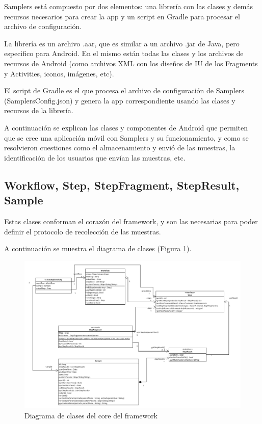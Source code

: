 Samplers está compuesto por dos elementos: una librería con las clases y demás recursos necesarios para crear la app y un script en Gradle para procesar el archivo de configuración.

La librería es un archivo .aar, que es similar a un archivo .jar de Java, pero especifico para Android. En el mismo están todas las clases y los archivos de recursos de Android (como archivos XML con los diseños de IU de los Fragments y Activities, iconos, imágenes, etc).

El script de Gradle es el que procesa el archivo de configuración de Samplers (SamplersConfig.json) y genera la app correspondiente usando las clases y recursos de la librería.

A continuación se explican las clases y componentes de Android que permiten que se cree una aplicación móvil con Samplers y su funcionamiento, y como se resolvieron cuestiones como el almacenamiento y envió de las muestras, la identificación de los usuarios que envían las muestras, etc.

\subsection{Workflow, Step, StepFragment, StepResult, Sample} \label{sec:clases_core}
Estas clases conforman el corazón del framework, y son las necesarias para poder definir el protocolo de recolección de las muestras.

A continuación se muestra el diagrama de clases (Figura \ref{fig:umlFrameworkCore}).

\begin{figure}[H]
  \centering
    \includegraphics[scale=0.4]{05-implementacion/FrameworkCore.png} 
   \caption{Diagrama de clases del core del framework}
   \label{fig:umlFrameworkCore}
\end{figure}


